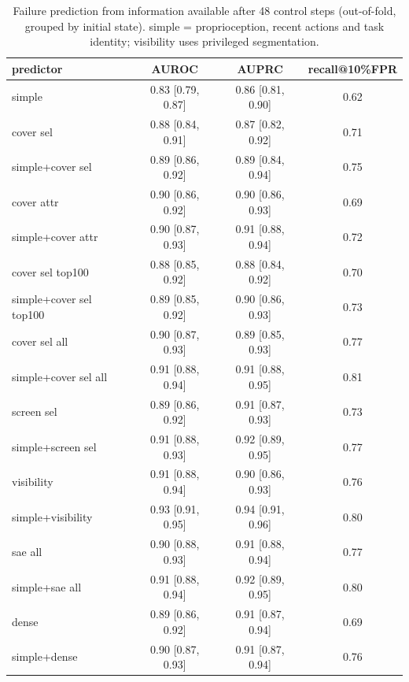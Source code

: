 \begin{table}[t]
\centering\small
\caption{Failure prediction from information available after 48 control steps (out-of-fold, grouped by initial state). simple = proprioception, recent actions and task identity; visibility uses privileged segmentation.}
\label{tab_E3_monitor}
\begin{tabular}{l c c c}
\toprule
predictor & AUROC & AUPRC & recall@10\%FPR \\
\midrule
simple & 0.83 [0.79, 0.87] & 0.86 [0.81, 0.90] & 0.62 \\
cover sel & 0.88 [0.84, 0.91] & 0.87 [0.82, 0.92] & 0.71 \\
simple+cover sel & 0.89 [0.86, 0.92] & 0.89 [0.84, 0.94] & 0.75 \\
cover attr & 0.90 [0.86, 0.92] & 0.90 [0.86, 0.93] & 0.69 \\
simple+cover attr & 0.90 [0.87, 0.93] & 0.91 [0.88, 0.94] & 0.72 \\
cover sel top100 & 0.88 [0.85, 0.92] & 0.88 [0.84, 0.92] & 0.70 \\
simple+cover sel top100 & 0.89 [0.85, 0.92] & 0.90 [0.86, 0.93] & 0.73 \\
cover sel all & 0.90 [0.87, 0.93] & 0.89 [0.85, 0.93] & 0.77 \\
simple+cover sel all & 0.91 [0.88, 0.94] & 0.91 [0.88, 0.95] & 0.81 \\
screen sel & 0.89 [0.86, 0.92] & 0.91 [0.87, 0.93] & 0.73 \\
simple+screen sel & 0.91 [0.88, 0.93] & 0.92 [0.89, 0.95] & 0.77 \\
visibility & 0.91 [0.88, 0.94] & 0.90 [0.86, 0.93] & 0.76 \\
simple+visibility & 0.93 [0.91, 0.95] & 0.94 [0.91, 0.96] & 0.80 \\
sae all & 0.90 [0.88, 0.93] & 0.91 [0.88, 0.94] & 0.77 \\
simple+sae all & 0.91 [0.88, 0.94] & 0.92 [0.89, 0.95] & 0.80 \\
dense & 0.89 [0.86, 0.92] & 0.91 [0.87, 0.94] & 0.69 \\
simple+dense & 0.90 [0.87, 0.93] & 0.91 [0.87, 0.94] & 0.76 \\
\bottomrule
\end{tabular}
\end{table}

